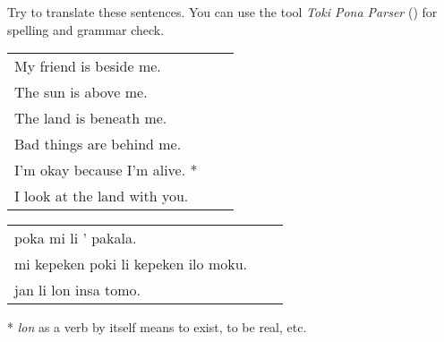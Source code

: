 Try to translate these sentences.
You can use the tool \textit{Toki Pona Parser} (\cite{www:rowa:02}) for spelling and grammar check.

\begin{supertabular}{p{5,5cm}|ll}
    My friend is beside me.       &  & \\
    The sun is above me.          &  & \\
    The land is beneath me.       &  & \\
    Bad things are behind me.     &  & \\
    I'm okay because I'm alive. * &  & \\
    I look at the land with you.  &  & \\
\end{supertabular}

\begin{supertabular}{p{5,5cm}|ll}
    poka mi li ' pakala.                 &  & \\
    mi kepeken poki li kepeken ilo moku. &  & \\
    jan li lon insa tomo.                &  & \\
\end{supertabular}

* \textit{lon} as a verb by itself means to exist, to be real, etc.